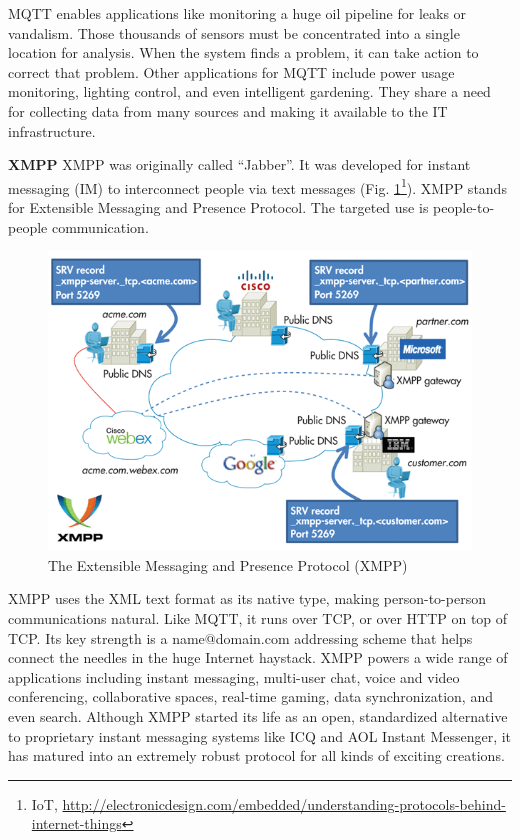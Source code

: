       MQTT enables applications like monitoring a huge oil pipeline for leaks or vandalism. Those thousands of sensors must be concentrated into a single location for analysis. When the system finds a problem, it can take action to correct that problem. Other applications for MQTT include power usage monitoring, lighting control, and even intelligent gardening. They share a need for collecting data from many sources and making it available to the IT infrastructure.

     \textbf{XMPP}
      \newline 
      XMPP was originally called ``Jabber''. It was developed for instant messaging (IM) to interconnect people via text messages (Fig. \ref{img:XMPP}\footnote{IoT, \url{http://electronicdesign.com/embedded/understanding-protocols-behind-internet-things}}). XMPP stands for Extensible Messaging and Presence Protocol. The targeted use is people-to-people communication.
      \begin{figure}[!ht]
      \centering
      \includegraphics[scale=0.7]{images/XMPP.png}   
      \caption[The Extensible Messaging and Presence Protocol (XMPP)]{The Extensible Messaging and Presence Protocol (XMPP)}
      \label{img:XMPP}                           
      \end{figure}
      XMPP uses the XML text format as its native type, making person-to-person communications natural. Like MQTT, it runs over TCP, or over HTTP on top of TCP. Its key strength is a name@domain.com addressing scheme that helps connect the needles in the huge Internet haystack. XMPP powers a wide range of applications including instant messaging, multi-user chat, voice and video conferencing, collaborative spaces, real-time gaming, data synchronization, and even search. Although XMPP started its life as an open, standardized alternative to proprietary instant messaging systems like ICQ and AOL Instant Messenger, it has matured into an extremely robust protocol for all kinds of exciting creations.


